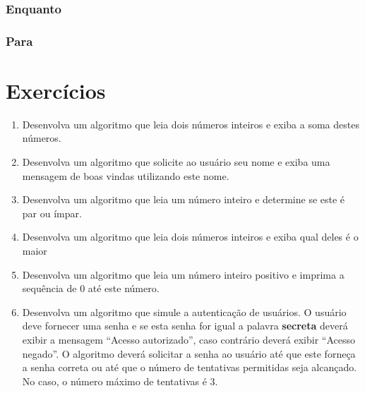 \documentclass[11pt]{../classes/ifscarticle}
\begin{document}
\subsubsection{Enquanto}



\subsubsection{Para}



\section{Exercícios}

\begin{enumerate}
	\item Desenvolva um algoritmo	que leia dois números inteiros e exiba a soma destes números.
	\item Desenvolva um algoritmo que solicite ao usuário seu nome e exiba uma mensagem de boas vindas utilizando este nome.
	\item Desenvolva um algoritmo que leia um número inteiro e determine se este é par ou ímpar.
	\item Desenvolva um algoritmo que leia dois números inteiros e exiba qual deles é o maior 
	\item Desenvolva um algoritmo que leia um número inteiro positivo e imprima a sequência de 0 até este número. 		\item Desenvolva um algoritmo que simule a autenticação de usuários. O usuário deve fornecer uma senha e se esta senha for igual a palavra \textbf{secreta} deverá exibir a mensagem ``Acesso autorizado'', caso contrário deverá exibir ``Acesso negado''. O algoritmo deverá solicitar a senha ao usuário até que este forneça a senha correta ou até que o número de tentativas permitidas seja alcançado. No caso, o número máximo de tentativas é $3$.
\end{enumerate}


\vspace*{\fill}
\licenciamentoLivre
\end{document}
